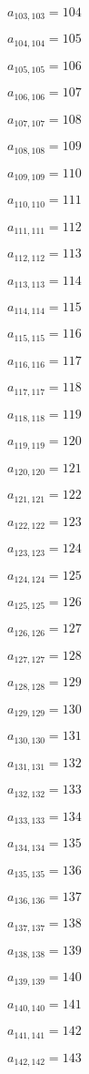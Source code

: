 \documentclass[a4paper,12pt]{article}
\begin{document}
$a _{ 103, 103 } = 104$

$a _{ 104, 104 } = 105$

$a _{ 105, 105 } = 106$

$a _{ 106, 106 } = 107$

$a _{ 107, 107 } = 108$

$a _{ 108, 108 } = 109$

$a _{ 109, 109 } = 110$

$a _{ 110, 110 } = 111$

$a _{ 111, 111 } = 112$

$a _{ 112, 112 } = 113$

$a _{ 113, 113 } = 114$

$a _{ 114, 114 } = 115$

$a _{ 115, 115 } = 116$

$a _{ 116, 116 } = 117$

$a _{ 117, 117 } = 118$

$a _{ 118, 118 } = 119$

$a _{ 119, 119 } = 120$

$a _{ 120, 120 } = 121$

$a _{ 121, 121 } = 122$

$a _{ 122, 122 } = 123$

$a _{ 123, 123 } = 124$

$a _{ 124, 124 } = 125$

$a _{ 125, 125 } = 126$

$a _{ 126, 126 } = 127$

$a _{ 127, 127 } = 128$

$a _{ 128, 128 } = 129$

$a _{ 129, 129 } = 130$

$a _{ 130, 130 } = 131$

$a _{ 131, 131 } = 132$

$a _{ 132, 132 } = 133$

$a _{ 133, 133 } = 134$

$a _{ 134, 134 } = 135$

$a _{ 135, 135 } = 136$

$a _{ 136, 136 } = 137$

$a _{ 137, 137 } = 138$

$a _{ 138, 138 } = 139$

$a _{ 139, 139 } = 140$

$a _{ 140, 140 } = 141$

$a _{ 141, 141 } = 142$

$a _{ 142, 142 } = 143$
\end{document}
